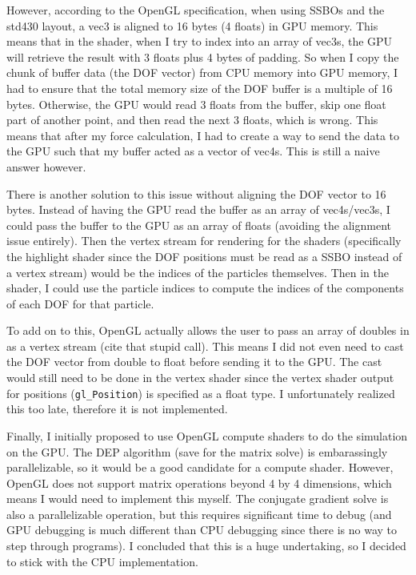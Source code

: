 \documentclass[letterpaper, 10 pt, conference]{ieeeconf}  %
\begin{document}
        However, according to the OpenGL specification, when using SSBOs and the std430 layout, a vec3 is aligned to 16 bytes (4 floats) in GPU memory. This means that in the shader, when I try to index into an array of vec3s, the GPU will retrieve the result with 3 floats plus 4 bytes of padding. So when I copy the chunk of buffer data (the DOF vector) from CPU memory into GPU memory, I had to ensure that the total memory size of the DOF buffer is a multiple of 16 bytes. Otherwise, the GPU would read 3 floats from the buffer, skip one float part of another point, and then read the next 3 floats, which is wrong. This means that after my force calculation, I had to create a way to send the data to the GPU such that my buffer acted as a vector of vec4s. This is still a naive answer however. 

        There is another solution to this issue without aligning the DOF vector to 16 bytes. Instead of having the GPU read the buffer as an array of vec4s/vec3s, I could pass the buffer to the GPU as an array of floats (avoiding the alignment issue entirely). Then the vertex stream for rendering for the shaders (specifically the highlight shader since the DOF positions must be read as a SSBO instead of a vertex stream) would be the indices of the particles themselves. Then in the shader, I could use the particle indices to compute the indices of the components of each DOF for that particle. 

        To add on to this, OpenGL actually allows the user to pass an array of doubles in as a vertex stream (cite that stupid call). This means I did not even need to cast the DOF vector from double to float before sending it to the GPU. The cast would still need to be done in the vertex shader since the vertex shader output for positions (\texttt{gl\_Position}) is specified as a float type. I unfortunately realized this too late, therefore it is not implemented. 

        Finally, I initially proposed to use OpenGL compute shaders to do the simulation on the GPU. The DEP algorithm (save for the matrix solve) is embarassingly parallelizable, so it would be a good candidate for a compute shader. However, OpenGL does not support matrix operations beyond 4 by 4 dimensions, which means I would need to implement this myself. The conjugate gradient solve is also a parallelizable operation, but this requires significant time to debug (and GPU debugging is much different than CPU debugging since there is no way to step through programs). I concluded that this is a huge undertaking, so I decided to stick with the CPU implementation.
\end{document}
